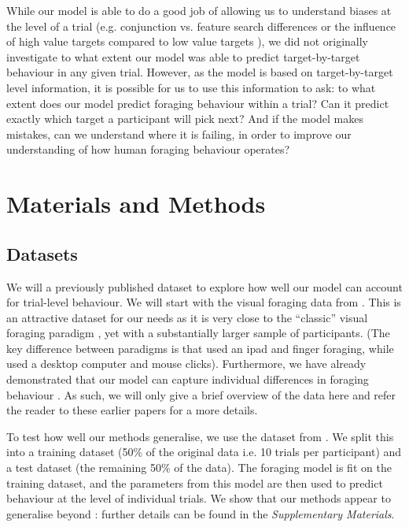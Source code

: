 \documentclass[vision,article,submit,pdftex,moreauthors]{Definitions/mdpi}
\begin{document}
While our model is able to do a good job of allowing us to understand biases at the level of a trial (e.g. conjunction vs. feature search differences \cite{kristjansson2014} or the influence of high value targets compared to low value targets \cite{tagu2020}), we did not originally investigate to what extent our model was able to predict target-by-target behaviour in any given trial. However, as the model is based on target-by-target level information, it is possible for us to use this information to ask: to what extent does our model predict foraging behaviour within a trial? Can it predict exactly which target a participant will pick next? And if the model makes mistakes, can we understand where it is failing, in order to improve our understanding of how human foraging behaviour operates?

\section{Materials and Methods}

\subsection{Datasets}

We will a previously published dataset to explore how well our model can account for trial-level behaviour. We will start with the visual foraging data from \cite{clarke2022}. This is an attractive dataset for our needs as it is very close to the ``classic'' visual foraging paradigm \citep{kristjansson2014}, yet with a substantially larger sample of participants. (The key difference between paradigms is that \cite{kristjansson2014} used an ipad and finger foraging, while \cite{clarke2022} used a desktop computer and mouse clicks). Furthermore, we have already demonstrated that our model can capture individual differences in foraging behaviour \citep{clarke2022}. As such, we will only give a brief overview of the data here and refer the reader to these earlier papers for a more details.

To test how well our methods generalise, we use the dataset from \citep{kristjansson2014}. We split this into a training dataset (50\% of the original data i.e. 10 trials per participant) and a test dataset (the remaining 50\% of the data). The foraging model is fit on the training dataset, and the parameters from this model are then used to predict behaviour at the level of individual trials. We show that our methods appear to generalise beyond \citep{clarke2022}: further details can be found in the \textit{Supplementary Materials}.
\end{document}
